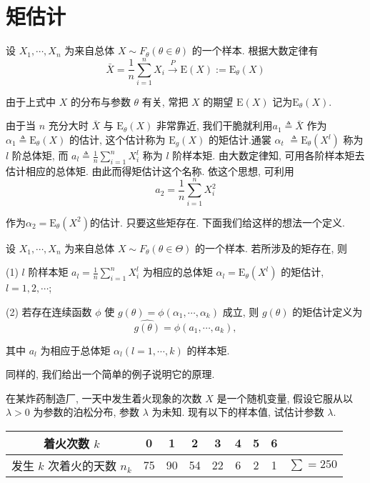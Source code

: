 \section{矩估计}

设 $X_1, \cdots, X_n$ 为来自总体 $X \sim F_\theta(\theta \in \theta)$ 的一个样本. 根据大数定律有
$$\bar{X}=\frac{1}{n} \sum_{i=1}^n X_i \stackrel{P}{\longrightarrow} \mathrm{E}(X) := \mathrm{E}_\theta(X)$$

由于上式中 $X$ 的分布与参数 $\theta$ 有关, 常把 $X$ 的期望 $\mathrm{E}(X)$ 记为$\mathrm{E}_\theta(X)$. 

由于当 $n$ 充分大时 $\bar{X}$ 与 $\mathrm{E}_\theta(X)$ 非常靠近, 我们干脆就利用$a_1 \triangleq \bar{X}$ 作为 $\alpha_1 \triangleq \mathrm{E}_\theta(X)$ 的估计, 这个估计称为 $\mathrm{E}_g(X)$ 的矩估计.通裳 $\alpha_t$ $\triangleq \mathrm{E}_\theta\left(X^l\right)$ 称为 $l$ 阶总体矩, 而 $a_l \triangleq \frac{1}{n} \sum_{i=1}^n X_i^l$ 称为 $l$ 阶样本矩. 由大数定律知, 可用各阶样本矩去估计相应的总体矩. 由此而得矩估计这个名称. 依这个思想, 可利用
$$
a_2=\frac{1}{n} \sum_{i=1}^n X_i^2
$$

作为$\alpha_2 =\mathrm E_\theta ({X^2})$的估计. 只要这些矩存在. 下面我们给这样的想法一个定义. 

\begin{definition}
    设 $X_1, \cdots, X_n$ 为来自总体 $X \sim F_\theta(\theta \in \Theta)$ 的一个样本. 若所涉及的矩存在, 则

(1) $l$ 阶样本矩 $a_l=\frac{1}{n} \sum_{i=1}^n X_i^l$ 为相应的总体矩 $\alpha_l=\mathrm{E}_\theta\left(X^l\right)$ 的矩估计, $l=1,2, \cdots$;


(2) 若存在连续函数 $\phi$ 使 $g(\theta)=\phi\left(\alpha_1, \cdots, \alpha_k\right)$ 成立, 则 $g(\theta)$ 的矩估计定义为
$$
\widehat{g(\theta)}=\phi\left(a_1, \cdots, a_k\right),
$$

其中 $a_l$ 为相应于总体矩 $\alpha_l(l=1, \cdots, k)$ 的样本矩.
\end{definition}

同样的, 我们给出一个简单的例子说明它的原理. 
\begin{example}
    在某炸药制造厂, 一天中发生着火现象的次数 $X$ 是一个随机变量, 假设它服从以 $\lambda>0$ 为参数的泊松分布, 参数 $\lambda$ 为未知. 现有以下的样本值, 试估计参数 $\lambda$.

\begin{tabular}{c|ccccccc|c} 
    着火次数 $k$ & 0 & 1 & 2 & 3 & 4 & 5 & 6 & \\
    \hline 发生 $k$ 次着火的天数 $n_k$ & 75 & 90 & 54 & 22 & 6 & 2 & 1 & $\sum=250$
    \end{tabular}
\end{example}

